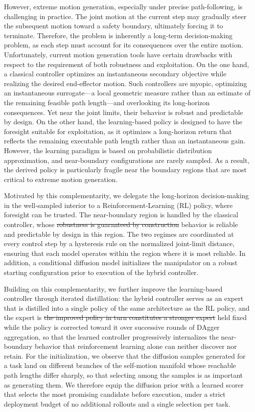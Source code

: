 \documentclass[journal, twoside]{IEEEtran}
\newcommand{\rev}[1]{\begingroup\color{magenta}#1\endgroup}
\newcommand{\rst}[1]{{\color{rstcolor}#1}}
\begin{document}
However, extreme motion generation, especially under precise path-following, is challenging in practice. The joint motion at the current step may gradually steer the subsequent motion toward a safety boundary, ultimately forcing it to terminate. Therefore, the problem is inherently a long-term decision-making problem, as each step must account for its consequences over the entire motion. Unfortunately, current motion generation tools have certain drawbacks with respect to the requirement of both robustness and exploitation. On the one hand, a classical controller optimizes an instantaneous secondary objective while realizing the desired end-effector motion. Such controllers are myopic, optimizing an instantaneous surrogate\rst{---a local geometric measure rather than an estimate of the remaining feasible path length---}and overlooking its long-horizon consequences. Yet near the joint limits, their behavior is robust and predictable by design. On the other hand, the learning-based policy is designed to have the foresight suitable for exploitation\rst{, as it optimizes a long-horizon return that reflects the remaining executable path length rather than an instantaneous gain}. However, the learning paradigm is based on probabilistic distribution approximation, and near-boundary configurations are rarely sampled. As a result, the derived policy is particularly fragile near the boundary regions that are most critical to extreme motion generation.

Motivated by this complementarity, we delegate the long-horizon decision-making in the well-sampled interior to a Reinforcement-Learning (RL) policy, where foresight can be trusted. The near-boundary region is handled by the classical controller, whose \sout{robustness is guaranteed by construction} \rst{behavior is reliable and predictable by design in this region}. The two regimes are coordinated at every control step by a hysteresis rule on the normalized joint-limit distance, ensuring that each model operates within the region where it is most reliable. In addition, a conditional diffusion model initializes the manipulator on a robust starting configuration prior to execution of the hybrid controller.

\rev{Building on this complementarity, we further improve the learning-based controller through iterated distillation: the hybrid controller serves as an expert that is distilled into a single policy of the same architecture as the RL policy, and the expert is \sout{the improved policy in turn constitutes a stronger expert} \rst{held fixed while the policy is corrected toward it over successive rounds of DAgger aggregation}, so that the learned controller progressively internalizes the near-boundary behavior that reinforcement learning alone can neither discover nor retain. For the initialization, we observe that the diffusion samples generated for a task land on different branches of the self-motion manifold whose reachable path lengths differ sharply, so that selecting among the samples is as important as generating them. We therefore equip the diffusion prior with a learned scorer that selects the most promising candidate before execution, under a strict deployment budget of no additional rollouts and a single selection per task.}
\end{document}
